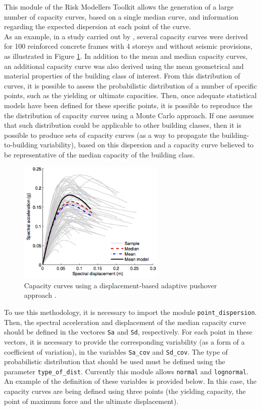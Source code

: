 This module of the Risk Modellers Toolkit allows the generation of a large number of capacity curves, based on a single median curve, and information regarding the expected dispersion at each point of the curve. \\

As an example, in a study carried out by \cite{SilvaEtAl2014b}, several capacity curves were derived for 100 reinforced concrete frames with 4 storeys and without seismic provisions, as illustrated in Figure \ref{fig:set_cc}. In addition to the mean and median capacity curves, an additional capacity curve was also derived using the mean geometrical and material properties of the building class of interest. From this distribution of curves, it is possible to assess the probabilistic distribution of a number of specific points, such as the yielding or ultimate capacities. Then, once adequate statistical models have been defined for these specific points, it is possible to reproduce the the distribution of capacity curves using a Monte Carlo approach. If one assumes that such distribution could be applicable to other building classes, then it is possible to produce sets of capacity curves (as a way to propagate the building-to-building variability), based on this dispersion and a capacity curve believed to be representative of the median capacity of the building class.

\begin{figure}[htb]
  \centering
      \includegraphics[width=7cm]{Figures/set_capacity_curves.png}
  \caption{Capacity curves using a displacement-based adaptive pushover approach \citep{SilvaEtAl2014b}.}
  \label{fig:set_cc}
\end{figure}

To use this methodology, it is necessary to import the module \verb=point_dispersion=. Then, the spectral acceleration and displacement of the median capacity curve should be defined in the vectores \verb=Sa= and \verb=Sd=, respectively. For each point in these vectors, it is necessary to provide the corresponding variability (as a form of a coefficient of variation), in the variables \verb=Sa_cov= and \verb=Sd_cov=. The type of probabilistic distribution that should be used must be defined using the parameter \verb=type_of_dist=. Currently this module allows \verb=normal= and \verb=lognormal=. An example of the definition of these variables is provided below. In this case, the capacity curves are being defined using three points (the yielding capacity, the point of maximum force and the ultimate displacement). 

